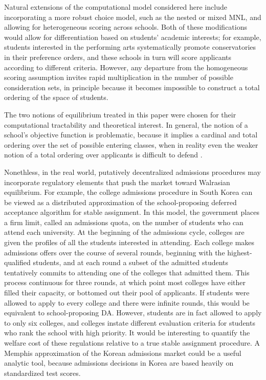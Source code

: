 \documentclass[12pt]{article}
\numberwithin{equation}{subsection}
\theoremstyle{definition}
\begin{document}
Natural extensions of the computational model considered here include incorporating a more robust choice model, such as the nested or mixed MNL, and allowing for heterogeneous scoring across schools. Both of these modifications would allow for differentiation based on students' academic interests; for example, students interested in the performing arts systematically promote conservatories in their preference orders, and these schools in turn will score applicants according to different criteria. However, any departure from the homogeneous scoring assumption invites rapid multiplication in the number of possible consideration sets, in principle because it becomes impossible to construct a total ordering of the space of students.

The two notions of equilibrium treated in this paper were chosen for their computational tractability and theoretical interest. In general, the notion of a school's objective function is problematic, because it implies a cardinal and total ordering over the set of possible entering classes, when in reality even the weaker notion of a total ordering over applicants is difficult to defend \parencite[][]{collegeadmissionsisnotmarriage}.

Nonethless, in the real world, putatively decentralized admissions procedures may incorporate regulatory elements that push the market toward Walrasian equilibrium. For example, the college admissions procedure in South Korea can be viewed as a distributed approximation of the school-proposing deferred acceptance algorithm for stable assignment. In this model, the government places a firm limit, called an admissions quota, on the number of students who can attend each university. At the beginning of the admissions cycle, colleges are given the profiles of all the students interested in attending. Each college makes admissions offers over the course of several rounds, beginning with the highest-qualified students, and at each round a subset of the admitted students tentatively commits to attending one of the colleges that admitted them. This process continuous for three rounds, at which point most colleges have either filled their capacity, or bottomed out their pool of applicants. If students were allowed to apply to every college and there were infinite rounds, this would be equivalent to school-proposing DA. However, students are in fact allowed to apply to only six colleges, and colleges instate different evaluation criteria for students who rank the school with high priority. It would be interesting to quantify the welfare cost of these regulations relative to a true stable assignment procedure. A Memphis approximation of the Korean admissions market could be a useful analytic tool, because admissions decisions in Korea are based heavily on standardized test scores. 
\end{document}
